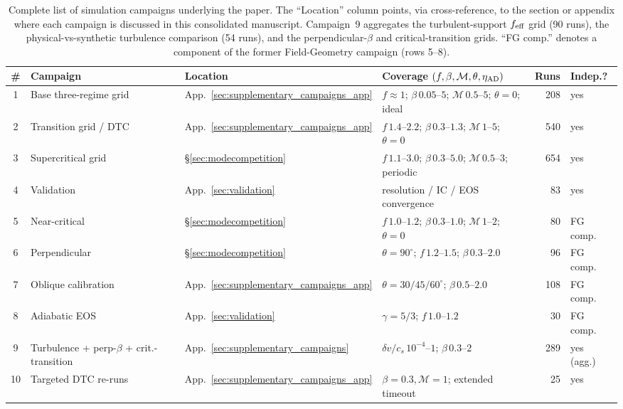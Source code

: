\documentclass[usenatbib,twoside,twocolumn]{mnras}
\begin{document}
\begin{table}
\caption{Complete list of simulation campaigns underlying the paper. The ``Location'' column points, via cross-reference, to the section or appendix where each campaign is discussed in this consolidated manuscript. Campaign~9 aggregates the turbulent-support $f_{\rm eff}$ grid (90 runs), the physical-vs-synthetic turbulence comparison (54 runs), and the perpendicular-$\beta$ and critical-transition grids. ``FG comp.'' denotes a component of the former Field-Geometry campaign (rows 5--8).}
\label{tab:campaigns}
\footnotesize
\setlength{\tabcolsep}{4pt}
\renewcommand{\arraystretch}{1.0}
\begin{tabular}{@{}c p{3.4cm} l p{4.0cm} r l@{}}
\toprule
\# & Campaign & Location & Coverage $(f,\beta,\mathcal{M},\theta,\eta_{\rm AD})$ & Runs & Indep.? \\
\midrule
1  & Base three-regime grid & App.~\ref{sec:supplementary_campaigns_app} & $f\approx1$; $\beta\,0.05$--$5$; $\mathcal{M}\,0.5$--$5$; $\theta=0$; ideal & 208 & yes \\
2  & Transition grid / DTC & App.~\ref{sec:supplementary_campaigns_app} & $f\,1.4$--$2.2$; $\beta\,0.3$--$1.3$; $\mathcal{M}\,1$--$5$; $\theta=0$ & 540 & yes \\
3  & Supercritical grid & \S\ref{sec:modecompetition} & $f\,1.1$--$3.0$; $\beta\,0.3$--$5.0$; $\mathcal{M}\,0.5$--$3$; periodic & 654 & yes \\
4  & Validation & App.~\ref{sec:validation} & resolution / IC / EOS convergence & 83 & yes \\
5  & Near-critical & \S\ref{sec:modecompetition} & $f\,1.0$--$1.2$; $\beta\,0.3$--$1.0$; $\mathcal{M}\,1$--$2$; $\theta=0$ & 80 & FG comp. \\
6  & Perpendicular & \S\ref{sec:modecompetition} & $\theta=90^\circ$; $f\,1.2$--$1.5$; $\beta\,0.3$--$2.0$ & 96 & FG comp. \\
7  & Oblique calibration & App.~\ref{sec:supplementary_campaigns_app} & $\theta=30/45/60^\circ$; $\beta\,0.5$--$2.0$ & 108 & FG comp. \\
8  & Adiabatic EOS & App.~\ref{sec:validation} & $\gamma=5/3$; $f\,1.0$--$1.2$ & 30 & FG comp. \\
9  & Turbulence + perp-$\beta$ + crit.-transition & App.~\ref{sec:supplementary_campaigns} & $\delta v/c_s\,10^{-4}$--$1$; $\beta\,0.3$--$2$ & 289 & yes (agg.) \\
10 & Targeted DTC re-runs & App.~\ref{sec:supplementary_campaigns_app} & $\beta=0.3,\mathcal{M}=1$; extended timeout & 25 & yes \\

\end{tabular}
\end{table}
\end{document}
